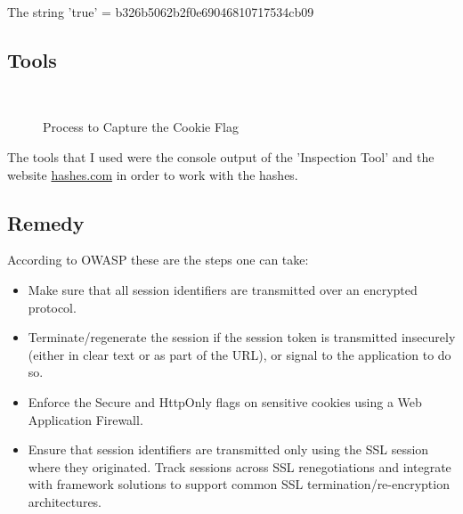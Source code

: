 The string 'true' = b326b5062b2f0e69046810717534cb09

\subsection{Tools}

\begin{figure}[!htb]
    \centering
     \quad
     \\
     \quad
    \caption[Flag 01 Method]{Process to Capture the Cookie Flag} %
    \label{fig:flag1 collection}
\end{figure}

The tools that I used were the console output of the 'Inspection Tool'
and the website \href{http://www.hashes.com}{hashes.com} in order to work
with the hashes.

\subsection{Remedy}

According to OWASP\cite{OWASPCookie} these are the steps one can take:
\begin{itemize}
    \item Make sure that all session identifiers are transmitted over an encrypted protocol.
    \item Terminate/regenerate the session if the session token is transmitted insecurely (either in clear text or as part of the URL), or signal to the application to do so.
    \item Enforce the Secure and HttpOnly flags on sensitive cookies using a Web Application Firewall.
    \item Ensure that session identifiers are transmitted only using the SSL session where they originated. Track sessions across SSL renegotiations and integrate with framework solutions to support common SSL termination/re-encryption architectures.
\end{itemize}